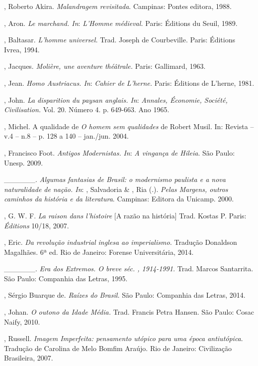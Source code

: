 \begin{Parskip}
, Roberto Akira. \emph{Malandragem revisitada}. Campinas: Pontes editora, 1988.

, Aron. \emph{Le marchand. In}: \emph{L'Homme médieval.}
Paris: Éditions du Seuil, 1989.

, Baltasar. \emph{L'homme universel.} Trad. Joseph de
Courbeville. Paris: Éditions Ivrea, 1994.

, Jacques. \emph{Molière, une aventure théâtrale.} Paris:
Gallimard, 1963.

, Jean. \emph{Homo Austriacus. In}: \emph{Cahier de L'herne.}
Paris: Éditions de L'herne, 1981.

, John. \emph{La disparition du paysan anglais. In}:
\emph{Annales, Économie, Société, Civilisation.} Vol. 20. Número 4.
p. 649-663. Ano 1965.

, Michel. A qualidade de \emph{O homem sem qualidades} de Robert Musil.
In: Revista  -- v.4 -- n.8 -- p. 128 a 140 -- jan./jun. 2004.

, Francisco Foot. \emph{Antigos Modernistas.} \emph{In}: \emph{A
vingança de Hileia}. São Paulo: Unesp. 2009.

\_\_\_\_\_\_. \emph{Algumas fantasias de Brasil: o modernismo paulista e
a nova naturalidade de nação. In}: , Salvadoria \& , Ria (.). \emph{Pelas Margens, outros caminhos da história e da literatura}.
Campinas: Editora da Unicamp. 2000.

, G. W. F. \emph{La raison dans l'histoire} [A razão na
história] Trad. Kostas P. Paris: \emph{Éditions} 10/18, 2007.

, Eric. \emph{Da revolução industrial inglesa ao
imperialismo.} Tradução Donaldson Magalhães. 6ª ed. Rio de Janeiro:
Forense Universitária, 2014.

\_\_\_\_\_\_. \emph{Era dos Extremos. O breve séc. , 1914-1991.}
Trad. Marcos Santarrita. São Paulo: Companhia das Letras, 1995.

, Sérgio Buarque de. \emph{Raízes do Brasil.} São Paulo: Companhia
das Letras, 2014.

, Johan. \emph{O outono da Idade Média.} Trad. Francis Petra
Hansen. São Paulo: Cosac Naify, 2010.

, Russell. \emph{Imagem Imperfeita: pensamento utópico para uma
época antiutópica}. Tradução de Carolina de Melo Bomfim Araújo.
Rio de Janeiro: Civilização Brasileira, 2007.


\end{Parskip}

